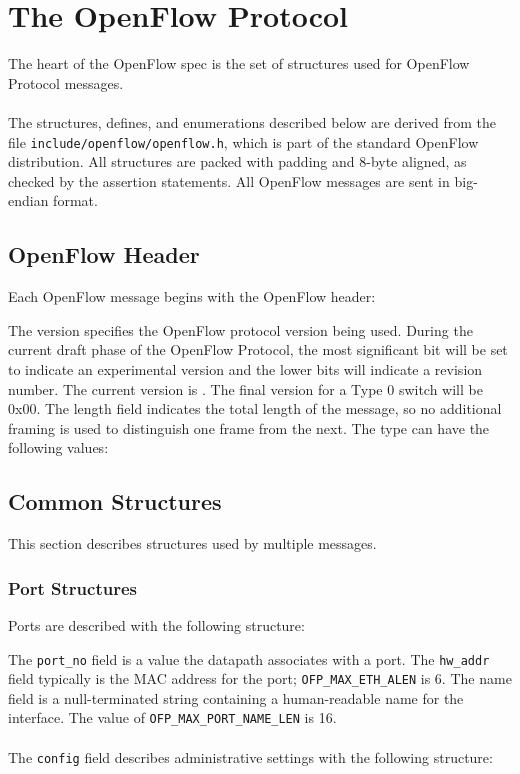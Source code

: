 \section{The OpenFlow Protocol}
The heart of the OpenFlow spec is the set of structures used for OpenFlow Protocol messages.  
\\\\
The structures, defines, and enumerations described below are derived from the file \verb|include/openflow/openflow.h|, which is part of the standard OpenFlow distribution.  All structures are packed with padding and 8-byte aligned, as checked by the assertion statements.  All OpenFlow messages are sent in big-endian format.  

\subsection{OpenFlow Header}
Each OpenFlow message begins with the OpenFlow header:


The version specifies the OpenFlow protocol version being used.  During the current draft phase of the OpenFlow Protocol, the most significant bit will be set to indicate an experimental version and the lower bits will indicate a revision number.  The current version is .  The final version for a Type 0 switch will be 0x00.  The length field indicates the total length of the message, so no additional framing is used to distinguish one frame from the next.  The type can have the following values:



\subsection{Common Structures}
This section describes structures used by multiple messages.

\subsubsection{Port Structures}
Ports are described with the following structure:


The \verb|port_no| field is a value the datapath associates with a port. The \verb|hw_addr| field typically is the MAC address for the port; \verb|OFP_MAX_ETH_ALEN| is 6.  The name field is a null-terminated string containing a human-readable name for the interface.  The value of \verb|OFP_MAX_PORT_NAME_LEN| is 16.  
\\\\
The \verb|config| field describes administrative settings with the following structure:

